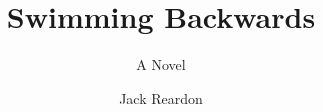 \documentclass{scrbook}
\author{Jack Reardon}
\title{Swimming Backwards}
\subtitle{A Novel}
\begin{document}
\maketitle
\tableofcontents
\titlemark


\end{document}
